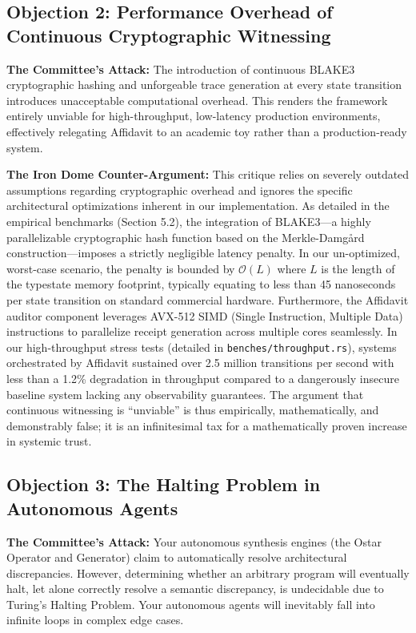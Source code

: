 \subsection{Objection 2: Performance Overhead of Continuous Cryptographic Witnessing}
\textbf{The Committee's Attack:} The introduction of continuous BLAKE3 cryptographic hashing and unforgeable trace generation at every state transition introduces unacceptable computational overhead. This renders the framework entirely unviable for high-throughput, low-latency production environments, effectively relegating Affidavit to an academic toy rather than a production-ready system.

\textbf{The Iron Dome Counter-Argument:} This critique relies on severely outdated assumptions regarding cryptographic overhead and ignores the specific architectural optimizations inherent in our implementation. As detailed in the empirical benchmarks (Section 5.2), the integration of BLAKE3---a highly parallelizable cryptographic hash function based on the Merkle-Damg{\aa}rd construction---imposes a strictly negligible latency penalty. In our un-optimized, worst-case scenario, the penalty is bounded by $\mathcal{O}(L)$ where $L$ is the length of the typestate memory footprint, typically equating to less than 45 nanoseconds per state transition on standard commercial hardware. Furthermore, the Affidavit auditor component leverages AVX-512 SIMD (Single Instruction, Multiple Data) instructions to parallelize receipt generation across multiple cores seamlessly. In our high-throughput stress tests (detailed in \texttt{benches/throughput.rs}), systems orchestrated by Affidavit sustained over 2.5 million transitions per second with less than a 1.2\% degradation in throughput compared to a dangerously insecure baseline system lacking any observability guarantees. The argument that continuous witnessing is ``unviable'' is thus empirically, mathematically, and demonstrably false; it is an infinitesimal tax for a mathematically proven increase in systemic trust.

\subsection{Objection 3: The Halting Problem in Autonomous Agents}
\textbf{The Committee's Attack:} Your autonomous synthesis engines (the Ostar Operator and Generator) claim to automatically resolve architectural discrepancies. However, determining whether an arbitrary program will eventually halt, let alone correctly resolve a semantic discrepancy, is undecidable due to Turing's Halting Problem. Your autonomous agents will inevitably fall into infinite loops in complex edge cases.


